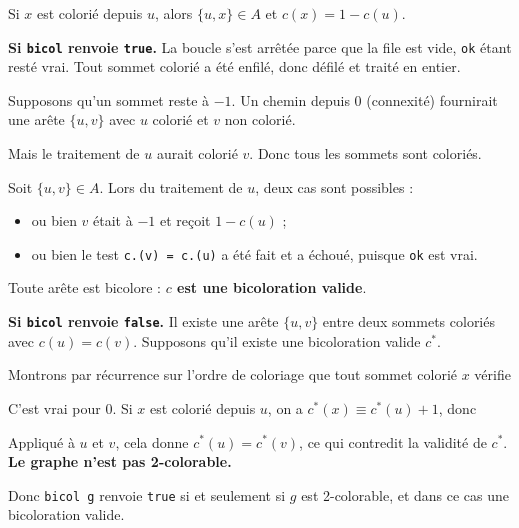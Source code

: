 \documentclass[11pt,a4paper]{article}
\providecommand{\tightlist}{\setlength{\itemsep}{0pt}\setlength{\parskip}{0pt}}
\newcommand{\equationajustee}[1]{%
  \sbox{\boiteequation}{$\displaystyle #1$}%
  \ifdim\wd\boiteequation>\linewidth
    \[\resizebox{\linewidth}{!}{\usebox{\boiteequation}}\]%
  \else
    \[#1\]%
  \fi}
\begin{document}
Si \(x\) est colorié depuis \(u\), alors \(\{u, x\} \in A\) et \(c(x) = 1 - c(u)\).

\textbf{Si \texttt{bicol} renvoie \texttt{true}.} La boucle s'est arrêtée parce que la file est vide, \texttt{ok} étant resté vrai. Tout sommet colorié a été enfilé, donc défilé et traité en entier.

Supposons qu'un sommet reste à \(-1\). Un chemin depuis \(0\) (connexité) fournirait une arête \(\{u, v\}\) avec \(u\) colorié et \(v\) non colorié.

Mais le traitement de \(u\) aurait colorié \(v\). Donc tous les sommets sont coloriés.

Soit \(\{u, v\} \in A\). Lors du traitement de \(u\), deux cas sont possibles :

\begin{itemize}
\tightlist
\item
  ou bien \(v\) était à \(-1\) et reçoit \(1 - c(u)\) ;
\item
  ou bien le test \texttt{c.(v)\ =\ c.(u)} a été fait et a échoué, puisque \texttt{ok} est vrai.
\end{itemize}

Toute arête est bicolore : \textbf{\(c\) est une bicoloration valide}.

\textbf{Si \texttt{bicol} renvoie \texttt{false}.} Il existe une arête \(\{u, v\}\) entre deux sommets coloriés avec \(c(u) = c(v)\). Supposons qu'il existe une bicoloration valide \(c^*\).

Montrons par récurrence sur l'ordre de coloriage que tout sommet colorié \(x\) vérifie

\equationajustee{c(x) \equiv c^*(x) + c^*(0) \pmod 2.}

C'est vrai pour \(0\). Si \(x\) est colorié depuis \(u\), on a \(c^*(x) \equiv c^*(u) + 1\), donc

\equationajustee{\begin{aligned}
c(x) &\equiv c(u) + 1 \\
&\equiv c^*(u) + c^*(0) + 1 \\
&\equiv c^*(x) + c^*(0) \pmod 2.
\end{aligned}}

Appliqué à \(u\) et \(v\), cela donne \(c^*(u) = c^*(v)\), ce qui contredit la validité de \(c^*\). \textbf{Le graphe n'est pas 2-colorable.}

Donc \texttt{bicol\ g} renvoie \texttt{true} si et seulement si \(g\) est 2-colorable, et dans ce cas une bicoloration valide.
\end{document}
